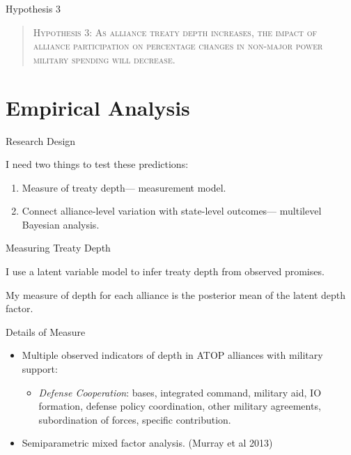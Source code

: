 \documentclass[12pt]{beamer}
\begin{document}

\begin{frame}{Hypothesis 3} 

\begin{quote}
\textsc{Hypothesis 3: As alliance treaty depth increases, the impact of alliance participation on percentage changes in non-major power military spending will decrease.}
\end{quote}

\end{frame}


\section{Empirical Analysis} 


\begin{frame}{Research Design}

I need two things to test these predictions: 

\pause 
\begin{enumerate} 
\item Measure of treaty depth--- measurement model. 
\pause
\item Connect alliance-level variation with state-level outcomes--- multilevel Bayesian analysis.  
\end{enumerate} 


\end{frame}


\begin{frame}{Measuring Treaty Depth}

I use a latent variable model to infer treaty depth from observed promises. 

\pause 

My measure of depth for each alliance is the posterior mean of the latent depth factor. 

\end{frame} 


\begin{frame}{Details of Measure}
 
\begin{itemize}
\item Multiple observed indicators of depth in ATOP alliances with military support: 
\begin{itemize} 
\item \textit{Defense Cooperation}: bases, integrated command, military aid, IO formation, defense policy coordination, other military agreements, subordination of forces, specific contribution. 
\end{itemize} 
\pause 
\item Semiparametric mixed factor analysis. (Murray et al 2013)
\end{itemize} 


\end{frame} 
\end{document}
